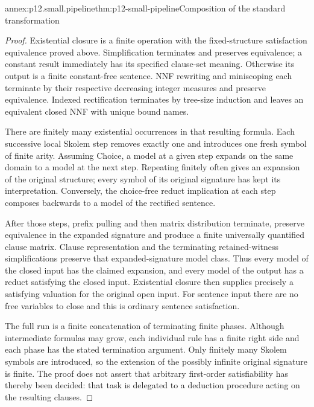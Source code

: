 \begin{annexitem}{annex:p12.small.pipeline}{thm:p12-small-pipeline}{Composition of the standard transformation}
\begin{proof}
Existential closure is a finite operation with the fixed-structure
satisfaction equivalence proved above. Simplification terminates
and preserves equivalence; a constant result immediately has its
specified clause-set meaning. Otherwise its output is a finite
constant-free sentence. NNF rewriting and miniscoping each terminate
by their respective decreasing integer measures and preserve
equivalence. Indexed rectification terminates by tree-size induction
and leaves an equivalent closed NNF with unique bound names.

There are finitely many existential occurrences in that resulting
formula. Each successive local Skolem step removes exactly one
and introduces one fresh symbol of finite arity. Assuming Choice,
a model at a given step expands on the same domain to a model at
the next step. Repeating finitely often gives an expansion of the
original structure; every symbol of its original signature has
kept its interpretation. Conversely, the choice-free reduct
implication at each step composes backwards to a model of the
rectified sentence.

After those steps, prefix pulling and then matrix distribution
terminate, preserve equivalence in the expanded signature and
produce a finite universally quantified clause matrix. Clause
representation and the terminating retained-witness simplifications
preserve that expanded-signature model class. Thus every model of
the closed input has the claimed expansion, and every model of
the output has a reduct satisfying the closed input. Existential
closure then supplies precisely a satisfying valuation for the
original open input. For sentence input there are no free variables
to close and this is ordinary sentence satisfaction.

The full run is a finite concatenation of terminating finite phases.
Although intermediate formulas may grow, each individual rule has
a finite right side and each phase has the stated termination
argument. Only finitely many Skolem symbols are introduced, so
the extension of the possibly infinite original signature is finite.
The proof does not assert that arbitrary first-order satisfiability
has thereby been decided: that task is delegated to a deduction
procedure acting on the resulting clauses.
\end{proof}
\end{annexitem}

